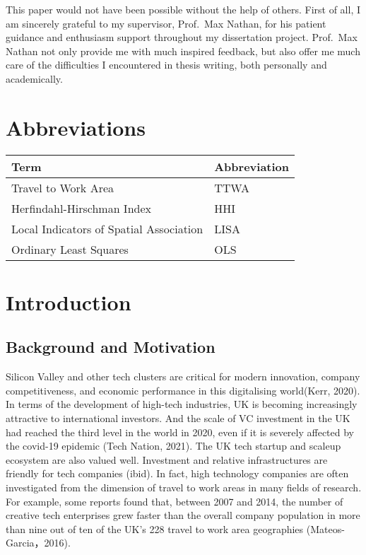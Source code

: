 \documentclass[
  12pt,
  oneside]{book}
\begin{document}
This paper would not have been possible without the help of others. First of all, I am sincerely grateful to my supervisor, Prof.~Max Nathan, for his patient guidance and enthusiasm support throughout my dissertation project. Prof.~Max Nathan not only provide me with much inspired feedback, but also offer me much care of the difficulties I encountered in thesis writing, both personally and academically.

\setcounter{tocdepth}{3}
\tableofcontents
\listoffigures
\listoftables

\hypertarget{abbreviations}{%
\chapter*{Abbreviations}\label{abbreviations}}

\begin{table}
\centering
\begin{tabular}{ll}
\toprule
\textbf{Term} & \textbf{Abbreviation}\\
\midrule
Travel to Work Area & TTWA\\
Herfindahl-Hirschman Index & HHI\\
Local Indicators of Spatial Association & LISA\\
Ordinary Least Squares & OLS\\
\bottomrule
\end{tabular}
\end{table}

\hypertarget{intro}{%
\chapter{Introduction}\label{intro}}


\hypertarget{background-and-motivation}{%
\section{Background and Motivation}\label{background-and-motivation}}

Silicon Valley and other tech clusters are critical for modern innovation, company competitiveness, and economic performance in this digitalising world(Kerr, 2020). In terms of the development of high-tech industries, UK is becoming increasingly attractive to international investors. And the scale of VC investment in the UK had reached the third level in the world in 2020, even if it is severely affected by the covid-19 epidemic (Tech Nation, 2021). The UK tech startup and scaleup ecosystem are also valued well. Investment and relative infrastructures are friendly for tech companies (ibid). In fact, high technology companies are often investigated from the dimension of travel to work areas in many fields of research. For example, some reports found that, between 2007 and 2014, the number of creative tech enterprises grew faster than the overall company population in more than nine out of ten of the UK's 228 travel to work area geographies (Mateos-Garcia，2016).
\end{document}
